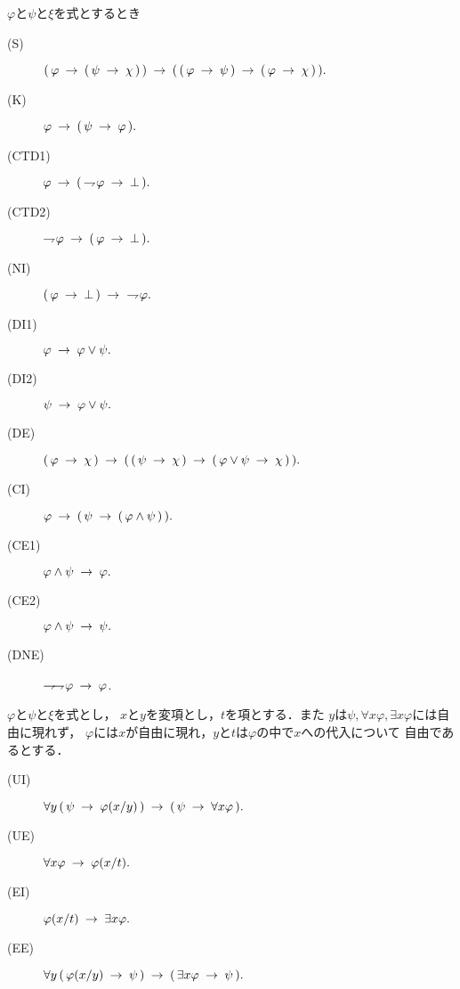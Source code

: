 	\begin{screen}
		\begin{logicalaxm}
			$\varphi$と$\psi$と$\xi$を式とするとき
			\begin{description}
				\item[(S)] $(\, \varphi \rarrow (\, \psi \rarrow \chi\, )\, ) 
					\rarrow (\, (\, \varphi \rarrow \psi\, )
					\rarrow (\, \varphi \rarrow \chi\, )\, ).$
				\item[(K)] $\varphi \rarrow (\, \psi \rarrow \varphi\, ).$
				\item[(CTD1)] $\varphi \rarrow (\, \negation \varphi \rarrow \bot\, ).$
				\item[(CTD2)] $\negation \varphi \rarrow (\, \varphi \rarrow \bot\, ).$
				\item[(NI)] $(\, \varphi \rarrow \bot\, ) \rarrow\ \negation \varphi.$
				\item[(DI1)] $\varphi \rarrow \varphi \vee \psi.$
				\item[(DI2)] $\psi \rarrow \varphi \vee \psi.$
				\item[(DE)] $(\, \varphi \rarrow \chi\, ) \rarrow 
					(\, (\, \psi \rarrow \chi\, ) 
					\rarrow (\, \varphi \vee \psi \rarrow \chi\, )\, ).$
				\item[(CI)] $\varphi \rarrow (\, \psi \rarrow (\, \varphi \wedge \psi\, )\, ).$
				\item[(CE1)] $\varphi \wedge \psi \rarrow \varphi.$
				\item[(CE2)] $\varphi \wedge \psi \rarrow \psi.$
				\item[(DNE)] $\negation \negation \varphi \rarrow \varphi$.
			\end{description}
		\end{logicalaxm}
	\end{screen}
	
	\begin{screen}
		\begin{logicalaxm}[{\bf HK}の公理(量化)]
			$\varphi$と$\psi$と$\xi$を式とし，
			$x$と$y$を変項とし，$t$を項とする．また
			$y$は$\psi,\forall x \varphi, \exists x \varphi$には自由に現れず，
			$\varphi$には$x$が自由に現れ，$y$と$t$は$\varphi$の中で$x$への代入について
			自由であるとする．
			\begin{description}
				\item[(UI)] $\forall y\, (\, \psi \rarrow \varphi(x/y)\, ) 
					\rarrow (\, \psi \rarrow \forall x \varphi\, ).$
				
				\item[(UE)] $\forall x \varphi \rarrow \varphi(x/t).$
				
				\item[(EI)] $\varphi(x/t) \rarrow \exists x \varphi.$
				
				\item[(EE)] $\forall y\, (\, \varphi(x/y) \rarrow \psi\, )
						\rarrow (\, \exists x \varphi \rarrow \psi\, ).$
			\end{description}
		\end{logicalaxm}
	\end{screen}
	
